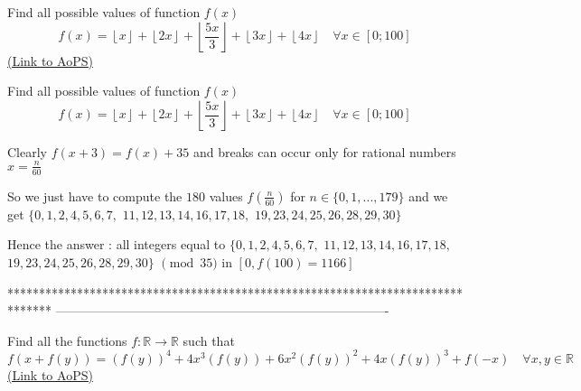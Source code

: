 \begin{problem}
	Find all possible values of function $f(x)$
\[f(x)=\left \lfloor  x\right \rfloor+\left \lfloor 2x \right \rfloor +\left \lfloor \frac{5x}{3} \right \rfloor +\left \lfloor 3x \right \rfloor +\left \lfloor 4x \right \rfloor \quad  \forall x\in [0;100]\]
	\flushright \href{https://artofproblemsolving.com/community/c6h586706}{(Link to AoPS)}
\end{problem}



\begin{solution}
	\begin{tcolorbox}Find all possible values of function $f(x)$
\[f(x)=\left \lfloor  x\right \rfloor+\left \lfloor 2x \right \rfloor +\left \lfloor \frac{5x}{3} \right \rfloor +\left \lfloor 3x \right \rfloor +\left \lfloor 4x \right \rfloor \quad  \forall x\in [0;100]\]\end{tcolorbox}
Clearly $f(x+3)=f(x)+35$ and breaks can occur only for rational numbers $x=\frac n{60}$

So we just have to compute the $180$ values $f(\frac n{60})$ for $n\in\{0,1,...,179\}$ and we get $\{0,1,2,4,5,6,7,$ $11,12,13,14,16,17,18,$ $19,23,24,25,26,28,29,30\}$


Hence the answer : 
all integers equal to $\{0,1,2,4,5,6,7,$ $11,12,13,14,16,17,18,$ $19,23,24,25,26,28,29,30\}$ $\pmod{35}$ in $[0,f(100)=1166]$
\end{solution}
*******************************************************************************
-------------------------------------------------------------------------------

\begin{problem}
	Find all the functions $f:\mathbb{R}\to\mathbb{R}$ such that 
\[f(x+f(y))=(f(y))^4+4x^3(f(y))+6x^2(f(y))^2+4x(f(y))^3+f(-x) \quad \forall x,y \in\mathbb R\]
	\flushright \href{https://artofproblemsolving.com/community/c6h586709}{(Link to AoPS)}
\end{problem}



